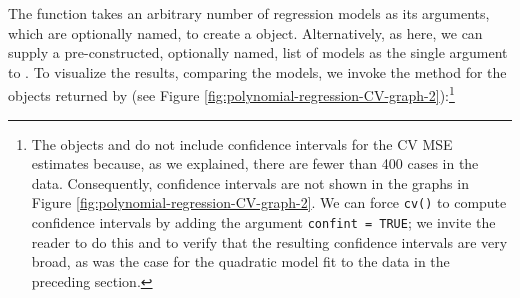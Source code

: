 \documentclass[
]{jss}
\begin{document}
The  function takes an arbitrary number of regression
models as its arguments, which are optionally named, to create a
 object. Alternatively, as here, we can supply a
pre-constructed, optionally named, list of models as the single argument
to . To visualize the results, comparing the models, we
invoke the  method for the  objects
returned by  (see Figure
\ref{fig:polynomial-regression-CV-graph-2}):\footnote{The objects
   and  do not include confidence
  intervals for the CV MSE estimates because, as we explained, there are
  fewer than 400 cases in the  data. Consequently, confidence
  intervals are not shown in the graphs in Figure
  \ref{fig:polynomial-regression-CV-graph-2}. We can force \texttt{cv()}
  to compute confidence intervals by adding the argument
  \texttt{confint\ =\ TRUE}; we invite the reader to do this and to
  verify that the resulting confidence intervals are very broad, as was
  the case for the quadratic model fit to the  data in the
  preceding section.}
\end{document}
